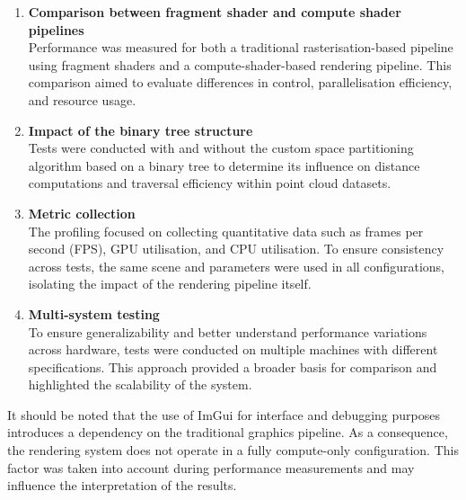 \documentclass{rapportcs}
\begin{document}
    \begin{enumerate}
    
        \item \textbf{Comparison between fragment shader and compute shader pipelines}\\
            Performance was measured for both a traditional rasterisation-based pipeline using fragment shaders and a compute-shader-based rendering pipeline. This comparison aimed to evaluate differences in control, parallelisation efficiency, and resource usage.\\
        
        \item \textbf{Impact of the binary tree structure}\\
            Tests were conducted with and without the custom space partitioning algorithm based on a binary tree to determine its influence on distance computations and traversal efficiency within point cloud datasets.\\
        
        \item \textbf{Metric collection}\\
            The profiling focused on collecting quantitative data such as frames per second (FPS), GPU utilisation, and CPU utilisation. To ensure consistency across tests, the same scene and parameters were used in all configurations, isolating the impact of the rendering pipeline itself.\\

        \item \textbf{Multi-system testing}\\
            To ensure generalizability and better understand performance variations across hardware, tests were conducted on multiple machines with different specifications. This approach provided a broader basis for comparison and highlighted the scalability of the system.\\

    \end{enumerate}
    
    \noindent It should be noted that the use of ImGui for interface and debugging purposes introduces a dependency on the traditional graphics pipeline. As a consequence, the rendering system does not operate in a fully compute-only configuration. This factor was taken into account during performance measurements and may influence the interpretation of the results.

\newpage
\end{document}
